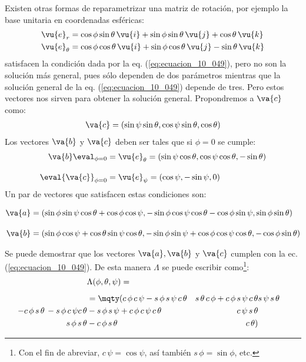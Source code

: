 \par
Existen otras formas de reparametrizar una matriz de rotación, por ejemplo la base unitaria en coordenadas esféricas:
\begin{align*}
\vu{e}_{r} &= \cos \phi \sin \theta \, \vu{i} + \sin \phi \sin \theta \, \vu{j} + \cos \theta \, \vu{k} \\
\vu{e}_{\theta} &= \cos \phi \cos \theta \, \vu{i} + \sin \phi \cos \theta \, \vu{j} - \sin \theta \, \vu{k}
\end{align*}
satisfacen la condición dada por la eq. (\ref{eq:ecuacion_10_049}), pero no son la solución más general, pues sólo dependen de dos parámetros mientras que la solución general de la eq. (\ref{eq:ecuacion_10_049}) depende de tres. Pero estos vectores nos sirven para obtener la solución general. Propondremos a $\va{c}$ como:
\begin{align}
\va{c} = (\sin \psi \sin \theta, \cos \psi \sin \theta, \cos \theta)
\label{eq:ecuacion_10_053}
\end{align}
Los vectores $\va{b}$ y $\va{c}$ deben ser tales que si $\phi = 0$ se cumple:
\begin{align}
\va{b}\eval_{\phi=0} &= \vu{e}_{\theta} = (\sin \psi \cos \theta, \cos \psi \cos \theta, - \sin \theta) \label{eq:ecuacion_10_054} \\[1em]
\eval{\va{c}}_{\phi=0} &= \vu{e}_{\psi} = (\cos \psi, -\sin \psi, 0) \label{eq:ecuacion_10_055}
\end{align}
Un par de vectores que satisfacen estas condiciones son:
\begin{changemargin}{-0.25cm}{-0.25cm} 
\begin{align*}
\va{a} &= (\sin \phi \sin \psi \cos \theta + \cos \phi \cos \psi, - \sin \phi \cos \psi \cos \theta - \cos \phi \sin \psi, \sin \phi \sin \theta) \\[1em]
\va{b} &= (\sin \phi \cos \psi + \cos \theta \sin \psi \cos \theta, -\sin \phi \sin \psi + \cos \phi \cos \psi \cos \theta, - \cos \phi \sin \theta)
\end{align*}
\end{changemargin}
Se puede demostrar que los vectores $\va{a}, \va{b}$ y $\va{c}$ cumplen con la ec. (\ref{eq:ecuacion_10_049}). De esta manera $\Lambda$ se puede escribir como\footnote{Con el fin de abreviar, $c \, \psi = \cos \psi$, así también $s \, \phi = \sin \phi$, etc.}:
\begin{align}
\begin{aligned}
&\Lambda (\phi, \theta, \psi) = \\[0.5em]
&= \mqty(
c \, \phi \, c \, \psi - s \, \phi \, s \, \psi \, c \, \theta & s \, \theta \, c \, \phi + c \, \phi \, s \, \psi \, c \, \theta & s \, \psi \, s \, \theta \\
- c \, \phi \, s \, \theta \, - s \, \phi \, c \, \psi c \, \theta & - s \, \phi \, s \, \psi + c \, \phi \, c \, \psi \, c \, \theta & c \, \psi \, s \, \theta \\
s \, \phi \, s \, \theta & - c \, \phi \, s \, \theta & c \, \theta)
\end{aligned}
\label{eq:ecuacion_10_056}
\end{align}
